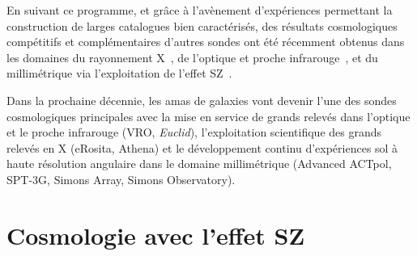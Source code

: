 En suivant ce programme, et
grâce à l'avènement d'expériences permettant la construction de larges
catalogues bien caractérisés, des résultats cosmologiques compétitifs
et complémentaires d'autres sondes ont été récemment obtenus dans les
domaines du rayonnement X~\citep{Vikhlinin2009, Bohringer2014, Mantz2015, Marulli2018,
  Pacaud2018}, de l'optique et proche infrarouge~\citep{Rozo2010,
  Mana2013, Costanzi2019}, et du millimétrique via l'exploitation de
l'effet SZ~\citep{Hasselfield2013_ACT_SZ, Planck2016_ymap,
  Planck_2016_SZ_cosmo, Bolliet2018, Bolliet2019, deHaan2016,
  Bocquet2019, Salvati2018, Zulbedia2019}.

Dans la prochaine décennie, les amas de galaxies vont devenir l'une
des sondes cosmologiques principales avec la mise en service de grands
relevés dans l'optique et le proche infrarouge (VRO, \emph{Euclid}), l'exploitation scientifique des grands relevés en X (eRosita, Athena) et le développement continu d'expériences sol à haute résolution angulaire dans le domaine millimétrique (Advanced ACTpol, SPT-3G, Simons Array, Simons Observatory). 


\section{Cosmologie avec l'effet SZ}
\label{se:cosmo_sz}


